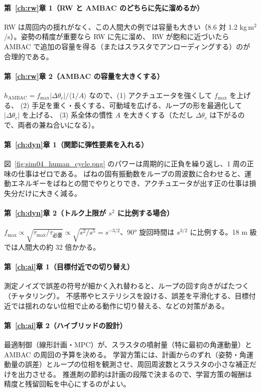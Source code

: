 \paragraph{第~\ref{ch:rw}章 1（RW と AMBAC のどちらに先に溜めるか）}
RW は周回内の揺れがなく、この人間大の例では容量も大きい（8.6 対 1.2 kg\,m$^2$/s）。姿勢の精度が重要なら RW に先に溜め、
RW が飽和に近づいたら AMBAC で追加の容量を得る（またはスラスタでアンローディングする）のが合理的である。

\paragraph{第~\ref{ch:rw}章 2（AMBAC の容量を大きくする）}
$h_{\mathrm{AMBAC}}=f_{\max}|\Delta\theta_c|/\langle1/A\rangle$ なので、(1) アクチュエータを強くして $f_{\max}$ を上げる、
(2) 手足を重く・長くする、可動域を広げる、ループの形を最適化して $|\Delta\theta_c|$ を上げる、
(3) 系全体の慣性 $A$ を大きくする（ただし $\Delta\theta_c$ は下がるので、両者の兼ね合いになる）。

\paragraph{第~\ref{ch:dyn}章 1（関節に弾性要素を入れる）}
図~\ref{fig:sim04_human_cycle.png} のパワーは周期的に正負を繰り返し、1 周の正味の仕事はゼロである。
ばねの固有振動数をループの周波数に合わせると、運動エネルギーをばねとの間でやりとりでき、アクチュエータが出す正の仕事は損失分だけに大きく減る。

\paragraph{第~\ref{ch:dyn}章 2（トルク上限が $s^2$ に比例する場合）}
$f_{\max}\propto\sqrt{\tau_{\max}/\tau_{\text{必要}}}\propto\sqrt{s^2/s^5}=s^{-3/2}$、90° 旋回時間は $s^{3/2}$ に比例する。18 m 級では人間大の約 32 倍かかる。

\paragraph{第~\ref{ch:ai}章 1（目標付近での切り替え）}
測定ノイズで誤差の符号が細かく入れ替わると、ループの回す向きがばたつく（チャタリング）。
不感帯やヒステリシスを設ける、誤差を平滑化する、目標付近では揺れのない位相で止める動作に切り替える、などの対策がある。

\paragraph{第~\ref{ch:ai}章 2（ハイブリッドの設計）}
最適制御（線形計画・MPC）が、スラスタの噴射量（特に最初の角運動量）と AMBAC の周回の予算を決める。
学習方策には、計画からのずれ（姿勢・角運動量の誤差）とループの位相を観測させ、周回周波数とスラスタの小さな補正だけを出力させる。
推進剤の節約は計画の段階で決まるので、学習方策の報酬は精度と残留回転を中心にするのがよい。

